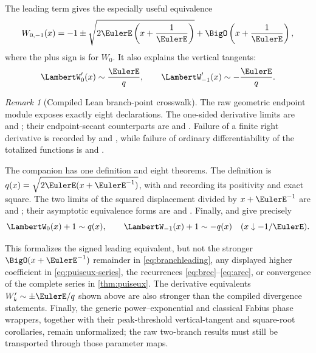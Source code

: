\documentclass[11pt]{article}
\theoremstyle{remark}
\newtheorem{remark}[remark]{Remark}
\newcommand{\Wz}{\LambertW_{0}}
\newcommand{\Wm}{\LambertW_{-1}}
\begin{document}
The leading term gives the especially useful equivalence
\begin{equation}\label{eq:branchleading}
 W_{0,-1}(x)
 =-1\mathbin{\pm}\sqrt{2\EulerE\left(x+\frac1\EulerE\right)}
 +\BigO\left(x+\frac1\EulerE\right),
\end{equation}
where the plus sign is for \(W_0\).  It also explains the vertical tangents:
\[
 \Wz'(x)\sim\frac{\EulerE}{q},\qquad
 \Wm'(x)\sim-\frac{\EulerE}{q}.
\]

\begin{remark}[Compiled Lean branch-point crosswalk]
\label{rem:formal-branchpoint-crosswalk}
The raw geometric endpoint module
 exposes exactly eight declarations.
The one-sided derivative limits are
 and
; their endpoint-secant
counterparts are
 and
.  Failure of a
finite right derivative is recorded by
 and
, while failure
of ordinary differentiability of the totalized functions is
 and
.

The companion  has one definition
and eight theorems.  The definition
 is
\(q(x)=\sqrt{2\EulerE(x+\EulerE^{-1})}\), with
 and
 recording its positivity and exact
square.  The two limits of the squared displacement divided by
\(x+\EulerE^{-1}\) are
 and
; their asymptotic
equivalence forms are
 and
.  Finally,
 and
 give precisely
\[
 \Wz(x)+1\sim q(x),\qquad \Wm(x)+1\sim-q(x)
 \quad(x\downarrow-1/\EulerE).
\]

This formalizes the signed leading equivalent, but not the stronger
\(\BigO(x+\EulerE^{-1})\) remainder in \eqref{eq:branchleading}, any displayed
higher coefficient in \eqref{eq:puiseux-series}, the recurrences
\eqref{eq:brec}--\eqref{eq:arec}, or convergence of the complete series in
\cref{thm:puiseux}.  The derivative equivalents \(W_k'\sim\pm\EulerE/q\) shown
above are also stronger than the compiled divergence statements.  Finally,
the generic power--exponential and classical Fabius phase wrappers, together
with their peak-threshold vertical-tangent and square-root corollaries,
remain unformalized; the raw two-branch results must still be transported
through those parameter maps.
\end{remark}
\end{document}
